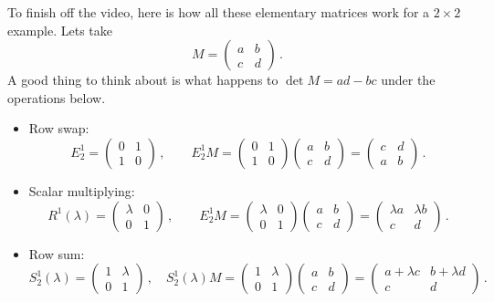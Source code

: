 {To finish off the video, here is how all these elementary matrices work for a $2\times 2$ example. Lets take 
$$
M=\begin{pmatrix}a&b\\c&d\end{pmatrix}\, .
$$
A good thing to think about is what happens to $\det M = ad-bc$ under the operations below.
\begin{itemize}
\item Row swap:
$$
E^1_2=\begin{pmatrix}0&1\\1&0\end{pmatrix}\, ,\qquad
E^1_2 M = \begin{pmatrix}0&1\\1&0\end{pmatrix}\begin{pmatrix}a&b\\c&d\end{pmatrix}
=\begin{pmatrix}c&d\\a&b\end{pmatrix}\, .
$$
\item Scalar multiplying:
$$
R^1(\lambda)=\begin{pmatrix}\lambda&0\\0&1\end{pmatrix}\, ,\qquad
E^1_2 M = \begin{pmatrix}\lambda&0\\0&1\end{pmatrix}\begin{pmatrix}a&b\\c&d\end{pmatrix}
=\begin{pmatrix}\lambda a&\lambda b\\c&d\end{pmatrix}\, .
$$
\item Row sum:
$$
S^1_2(\lambda)=\begin{pmatrix}1&\lambda\\0&1\end{pmatrix}\, ,\quad
S^1_2(\lambda) M = \begin{pmatrix}1&\lambda\\0&1\end{pmatrix}\begin{pmatrix}a&b\\c&d\end{pmatrix}
=\begin{pmatrix}a+\lambda c&b+\lambda d\\c&d\end{pmatrix}\, .
$$
\end{itemize}


} %

